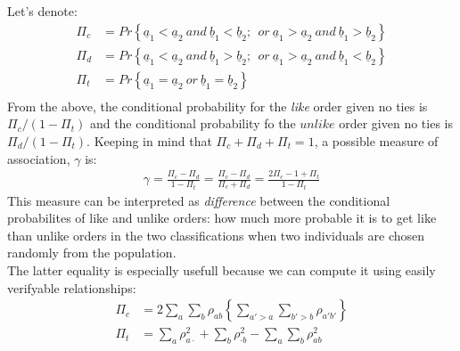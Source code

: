 \documentclass[]{article}
\begin{document}
Let's denote:
$$
\begin{aligned}
	\Pi_c&=Pr\left\{ \underline{a}_1 <\underline{a}_2 ~and ~\underline{b}_1<\underline{b}_2;~~or~\underline{a}_1 >\underline{a}_2 ~and ~\underline{b}_1>\underline{b}_2\right\}\\
	\Pi_d&=Pr\left\{ \underline{a}_1 <\underline{a}_2 ~and ~\underline{b}_1>\underline{b}_2;~~or~\underline{a}_1 >\underline{a}_2 ~and ~\underline{b}_1<\underline{b}_2\right\}\\
	\Pi_t&=Pr\left\{\underline{a}_1 =\underline{a}_2 ~or ~\underline{b}_1=\underline{b}_2\right\}\\
\end{aligned}
$$
From the above, the conditional probability for the \emph{like} order given no ties is $\Pi_c/(1-\Pi_t)$ and the conditional probability fo the $unlike$ order given no ties is $\Pi_d/(1-\Pi_t)$. Keeping in mind that $\Pi_c +\Pi_d +\Pi_t=1$, a possible measure of association, $\gamma$ is:
$$
\begin{aligned}
	\gamma = \frac{\Pi_c - \Pi_d}{1-\Pi_t} =  \frac{\Pi_c - \Pi_d}{\Pi_c + \Pi_d} = \frac{2\Pi_c - 1 + \Pi_t}{1- \Pi_t}
\end{aligned}
$$
This measure can be interpreted as \emph{difference} between the conditional probabilites of like and unlike orders: how much more probable it is to get like than unlike orders in the two classifications when two individuals are chosen randomly from the population.\\
The latter equality is especially usefull because we can compute it using easily verifyable relationships:
$$
\begin{aligned}
	\Pi_c&=2\sum_a \sum_b \rho_{ab}\left\{ \sum_{a'>a} \sum_{b'>b} \rho_{a'b'} \right\}\\
	\Pi_t&=\sum_a \rho_{a\cdot}^2 + \sum_b \rho_{\cdot b}^2 - \sum_{a} \sum_{b} \rho_{ab}^2\\
\end{aligned}
$$
\end{document}
